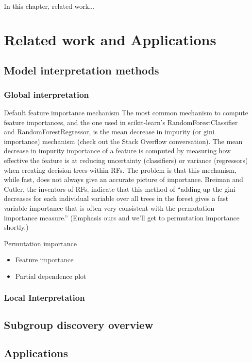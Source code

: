 In this chapter, related work... \cite{eli5}

\section{Related work and Applications}


\subsection{Model interpretation methods}

\subsubsection{Global interpretation}

Default feature importance mechanism
The most common mechanism to compute feature importances, and the one used in scikit-learn's RandomForestClassifier and RandomForestRegressor, is the mean decrease in impurity (or gini importance) mechanism (check out the Stack Overflow conversation). The mean decrease in impurity importance of a feature is computed by measuring how effective the feature is at reducing uncertainty (classifiers) or variance (regressors) when creating decision trees within RFs. The problem is that this mechanism, while fast, does not always give an accurate picture of importance. Breiman and Cutler, the inventors of RFs, indicate that this method of “adding up the gini decreases for each individual variable over all trees in the forest gives a fast variable importance that is often very consistent with the permutation importance measure.” (Emphasis ours and we'll get to permutation importance shortly.)

Permutation importance
\begin{itemize}
	\item Feature importance
	\item Partial dependence plot
\end{itemize}

\subsubsection{Local Interpretation}

\subsection{Subgroup discovery overview}


\subsection{Applications}






